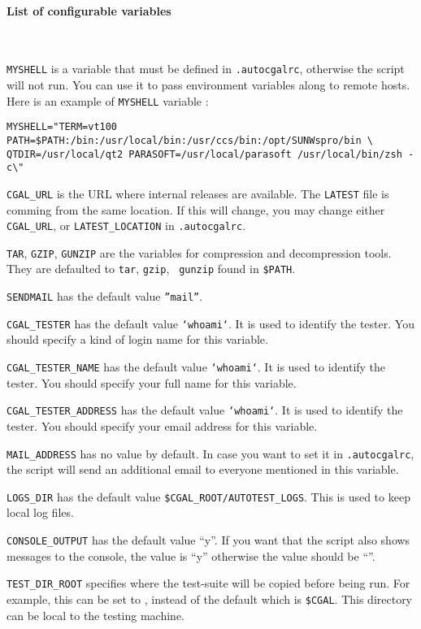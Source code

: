 \paragraph{List of configurable variables} ~

{\tt MYSHELL} is a variable that must be defined in {\tt .autocgalrc},
otherwise the script will not run.  You can use it to pass environment
variables along to remote hosts.  Here is an example of {\tt MYSHELL}
variable :
\begin{verbatim}
MYSHELL="TERM=vt100 PATH=$PATH:/bin:/usr/local/bin:/usr/ccs/bin:/opt/SUNWspro/bin \
QTDIR=/usr/local/qt2 PARASOFT=/usr/local/parasoft /usr/local/bin/zsh -c\"
\end{verbatim}

{\tt CGAL\_URL} is the URL where internal releases are available.
The {\tt LATEST} file is comming from the same location. If this will change,
you may change either {\tt CGAL\_URL}, or {\tt LATEST\_LOCATION}
in {\tt .autocgalrc}.

{\tt TAR}, {\tt GZIP}, {\tt GUNZIP} are the variables for compression and
decompression tools.  They are defaulted to {\tt tar}, {\tt gzip}, {\tt
gunzip} found in {\tt \$PATH}.

{\tt SENDMAIL} has the default value {\tt ''mail''}.

{\tt CGAL\_TESTER} has the default value {\tt `whoami`}.  It is used to
identify the tester.  You should specify a kind of login name for this
variable.

{\tt CGAL\_TESTER\_NAME} has the default value {\tt `whoami`}.  It is used to
identify the tester.  You should specify your full name for this variable.

{\tt CGAL\_TESTER\_ADDRESS} has the default value {\tt `whoami`}.  It is used
to identify the tester.  You should specify your email address for this
variable.

{\tt MAIL\_ADDRESS} has no value by default. In case you want to
set it in {\tt .autocgalrc}, the script will send an additional email to
everyone mentioned in this variable.

{\tt LOGS\_DIR} has the default value {\tt \$CGAL\_ROOT/AUTOTEST\_LOGS}.  This
is used to keep local log files.

{\tt CONSOLE\_OUTPUT} has the default value ``y''. If you want that the script
 also shows messages to the console, the value is ``y'' otherwise the value
should be ``''.

{\tt TEST\_DIR\_ROOT} specifies where the test-suite will be copied before
being run.  For example, this can be set to \ccc{/tmp}, instead of the default
which is {\tt \$CGAL}.  This directory can be local to the testing machine.

